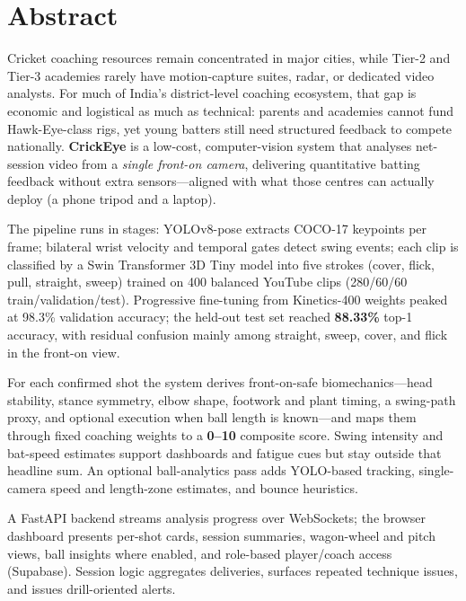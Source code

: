 \chapter*{Abstract}

\par Cricket coaching resources remain concentrated in major cities, while Tier-2 and Tier-3 academies rarely have motion-capture suites, radar, or dedicated video analysts. For much of India’s district-level coaching ecosystem, that gap is economic and logistical as much as technical: parents and academies cannot fund Hawk-Eye-class rigs, yet young batters still need structured feedback to compete nationally. \textbf{CrickEye} is a low-cost, computer-vision system that analyses net-session video from a \emph{single front-on camera}, delivering quantitative batting feedback without extra sensors---aligned with what those centres can actually deploy (a phone tripod and a laptop).

\par The pipeline runs in stages: YOLOv8-pose extracts COCO-17 keypoints per frame; bilateral wrist velocity and temporal gates detect swing events; each clip is classified by a Swin Transformer 3D Tiny model into five strokes (cover, flick, pull, straight, sweep) trained on 400 balanced YouTube clips (280/60/60 train/validation/test). Progressive fine-tuning from Kinetics-400 weights peaked at 98.3\% validation accuracy; the held-out test set reached \textbf{88.33\%} top-1 accuracy, with residual confusion mainly among straight, sweep, cover, and flick in the front-on view.

\par For each confirmed shot the system derives front-on-safe biomechanics---head stability, stance symmetry, elbow shape, footwork and plant timing, a swing-path proxy, and optional execution when ball length is known---and maps them through fixed coaching weights to a \textbf{0--10} composite score. Swing intensity and bat-speed estimates support dashboards and fatigue cues but stay outside that headline sum. An optional ball-analytics pass adds YOLO-based tracking, single-camera speed and length-zone estimates, and bounce heuristics.

\par A FastAPI backend streams analysis progress over WebSockets; the browser dashboard presents per-shot cards, session summaries, wagon-wheel and pitch views, ball insights where enabled, and role-based player/coach access (Supabase). Session logic aggregates deliveries, surfaces repeated technique issues, and issues drill-oriented alerts.

